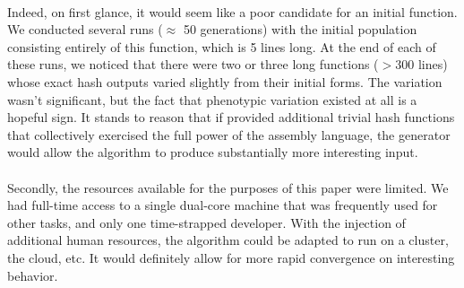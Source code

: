 \documentclass{article}
\begin{document}
\paragraph{}
Indeed, on first glance, it would seem like a poor candidate for an initial function. We conducted several runs ($\approx$ 50 generations) with the initial population consisting entirely of this function, which is 5 lines long. At the end of each of these runs, we noticed that there were two or three long functions ($>$300 lines) whose exact hash outputs varied slightly from their initial forms. The variation wasn't significant, but the fact that phenotypic variation existed at all is a hopeful sign. It stands to reason that if provided additional trivial hash functions that collectively exercised the full power of the assembly language, the generator would allow the algorithm to produce substantially more interesting input.

\paragraph{}
Secondly, the resources available for the purposes of this paper were limited. We had full-time access to a single dual-core machine that was frequently used for other tasks, and only one time-strapped developer. With the injection of additional human resources, the algorithm could be adapted to run on a cluster, the cloud, etc. It would definitely allow for more rapid convergence on interesting behavior.
\end{document}
